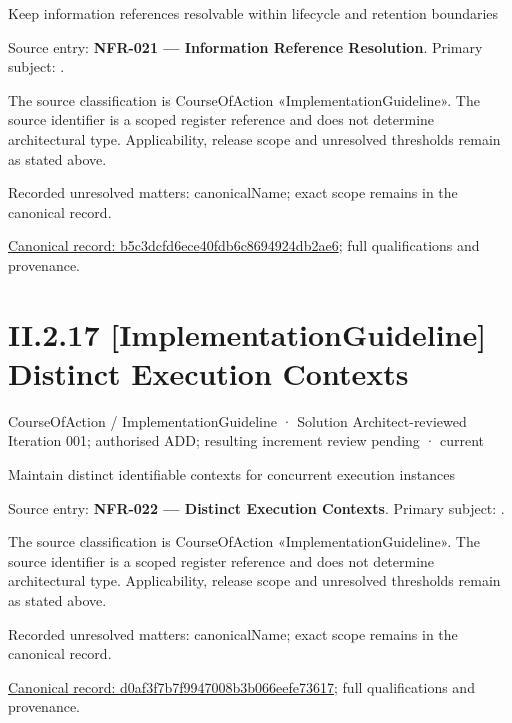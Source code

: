 Keep information references resolvable within lifecycle and retention boundaries



Source entry: \textbf{NFR-021 — Information Reference Resolution}. Primary subject: \texttt{}.



The source classification is CourseOfAction «ImplementationGuideline». The source identifier is a scoped register reference and does not determine architectural type. Applicability, release scope and unresolved thresholds remain as stated above.


{\small Recorded unresolved matters: canonicalName; exact scope remains in the canonical record.}\par
{\footnotesize \href{../../../../continuum/strategy/course-of-action/implementation-guideline/b5c3dcfd6ece40fdb6c8694924db2ae6.md}{Canonical record: b5c3dcfd6ece40fdb6c8694924db2ae6}; full qualifications and provenance.}\par
\section*{II.2.17 [ImplementationGuideline] Distinct Execution Contexts}
\label{navigation:II.2.17}

\label{element:d0af3f7b7f9947008b3b066eefe73617}
{\small CourseOfAction / ImplementationGuideline · Solution Architect-reviewed Iteration 001; authorised ADD; resulting increment review pending · current}\par

Maintain distinct identifiable contexts for concurrent execution instances



Source entry: \textbf{NFR-022 — Distinct Execution Contexts}. Primary subject: \texttt{}.



The source classification is CourseOfAction «ImplementationGuideline». The source identifier is a scoped register reference and does not determine architectural type. Applicability, release scope and unresolved thresholds remain as stated above.


{\small Recorded unresolved matters: canonicalName; exact scope remains in the canonical record.}\par
{\footnotesize \href{../../../../continuum/strategy/course-of-action/implementation-guideline/d0af3f7b7f9947008b3b066eefe73617.md}{Canonical record: d0af3f7b7f9947008b3b066eefe73617}; full qualifications and provenance.}\par

